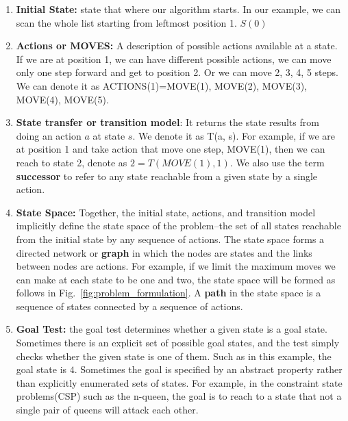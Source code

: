 \documentclass[../main.tex]{subfiles}
\begin{document}
\begin{enumerate}
    \item \textbf{Initial State:} state that where our algorithm starts. In our example, we can scan the whole list starting from leftmost position 1. $S(0)$
    \item \textbf{Actions or MOVES:} A description of possible actions available at a state. If we are at position 1, we can have different possible actions, we can move only one step forward and get to position 2. Or we can move 2, 3, 4, 5 steps. We can denote it as ACTIONS(1)={MOVE(1), MOVE(2), MOVE(3), MOVE(4), MOVE(5)}. 
    
    \item \textbf{State transfer or transition model}: It returns the state results from doing an action $a$ at state $s$. We denote it as T(a, s). For example, if we are at position 1 and take action that move one step, MOVE(1), then we can reach to state 2, denote as $2=T(MOVE(1), 1)$. We also use the term \textbf{successor} to refer to any state reachable from a given state by a single action. 
    
  \item \textbf{State Space:} Together, the initial state,  actions, and transition model implicitly define the state space of the problem--the set of all states reachable from the initial state by any sequence of actions. The state space forms a directed network or \textbf{graph} in which the nodes are states and the links between nodes are actions. For example, if we limit the maximum moves we can make at each state to be one and two, the state space will be formed as follows in Fig.~\ref{fig:problem_formulation}. A \textbf{path} in the state space is a sequence of states connected by a sequence of actions. 
    
    
  \item  \textbf{Goal Test:} the goal test determines whether a given state is a goal state. Sometimes there is an explicit set of possible goal states, and the test simply checks whether the given state is one of them. Such as in this example, the goal state is $4$. Sometimes the goal is specified by an abstract property rather than explicitly enumerated sets of states. For example, in the constraint state problems(CSP) such as the n-queen, the goal is to reach to a state that not a single pair of queens will attack each other. 
\end{enumerate}
\end{document}
